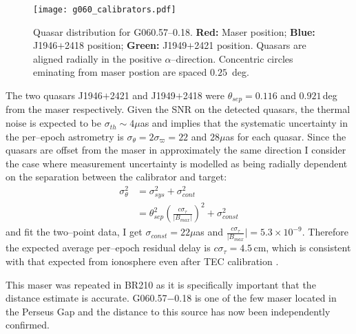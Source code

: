             \begin{SCfigure}
            	\centering
            	\texttt{[image: g060\_calibrators.pdf]}
				\caption[G060.57--0.18 quasar distribution]{Quasar distribution for G060.57--0.18. \textbf{Red:} Maser position; \textbf{Blue:} J1946$+$2418 position; \textbf{Green:} J1949$+$2421 position. Quasars are aligned radially in the positive $\alpha$--direction. Concentric circles eminating from maser postion are spaced $0.25$~deg.} \label{fig:g060_quasars}
            \end{SCfigure}
            
            The two quasars J1946$+$2421 and J1949$+$2418 were $\theta_{sep}=0.116$ and $0.921$\,deg from the maser respectively. Given the SNR on the detected quasars, the thermal noise is expected to be $\sigma_{th}\sim4\mu$as and implies that the systematic uncertainty in the per--epoch astrometry is $\sigma_\theta=2\sigma_\varpi=22$ and $28\mu$as for each quasar. Since the quasars are offset from the maser in approximately the same direction I consider the case where measurement uncertainty is modelled as being radially dependent on the separation between the calibrator and target:
			\begin{equation*}
			\begin{split}
				\sigma_\theta^2 &= \sigma_{sys}^2 + \sigma_{cont}^2 \\
								&= \theta_{sep}^2\left(\frac{c\sigma_\tau}{|B_{max}|}\right)^2 + \sigma_{const}^2
			\end{split}
			\end{equation*} and fit the two--point data, I get $\sigma_{const}=22\mu$as and $\frac{c\sigma_\tau}{|B_{max}}|=5.3\times10^{-9}$. Therefore the expected average per--epoch residual delay is $c\sigma_\tau=4.5$\,cm, which is consistent with that expected from ionosphere even after TEC calibration \citep{WalkerChatterjee1999}. %
           
            This maser was repeated in BR210 as it is specifically important that the distance estimate is accurate. G060.57$-$0.18 is one of the few maser located in the Perseus Gap and the distance to this source has now been independently confirmed.

		\clearpage
